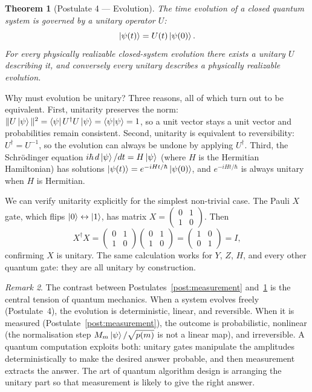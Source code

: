 \documentclass[12pt, a4paper, oneside]{report}
\theoremstyle{plain}
\newtheorem{theorem}{Theorem}[chapter]
\theoremstyle{definition}
\theoremstyle{remark}
\newtheorem{remark}[theorem]{Remark}
\begin{document}
\begin{theorem}[Postulate 4 --- Evolution]
	\label{post:evolution}
	The time evolution of a closed quantum system is governed by a unitary operator $U$:
	\[
		\ket{\psi(t)} = U(t)\ket{\psi(0)}.
	\]
	For every physically realizable closed-system evolution there exists a unitary $U$ describing
	it, and conversely every unitary describes a physically realizable evolution.
\end{theorem}

Why must evolution be unitary? Three reasons, all of which turn out to be equivalent.
First, unitarity preserves the norm: $\|U\ket{\psi}\|^2 = \bra{\psi}U^\dagger U\ket{\psi}
	= \braket{\psi|\psi} = 1$, so a unit vector stays a unit vector and probabilities remain
consistent. Second, unitarity is equivalent to reversibility: $U^\dagger = U^{-1}$, so the
evolution can always be undone by applying $U^\dagger$. Third, the Schrödinger equation
$i\hbar\,d\ket{\psi}/dt = H\ket{\psi}$ (where $H$ is the Hermitian Hamiltonian) has
solutions $\ket{\psi(t)} = e^{-iHt/\hbar}\ket{\psi(0)}$, and $e^{-iHt/\hbar}$ is always
unitary when $H$ is Hermitian.

We can verify unitarity explicitly for the simplest non-trivial case. The Pauli $X$ gate,
which flips $\ket{0} \leftrightarrow \ket{1}$, has matrix $X = \begin{pmatrix}0 & 1 \\1&0
	\end{pmatrix}$. Then
\[
	X^\dagger X
	= \begin{pmatrix}0&1\\1&0\end{pmatrix}\begin{pmatrix}0&1\\1&0\end{pmatrix}
	= \begin{pmatrix}1&0\\0&1\end{pmatrix} = I,
\]
confirming $X$ is unitary. The same calculation works for $Y$, $Z$, $H$, and every other
quantum gate: they are all unitary by construction.

\begin{remark}
	The contrast between Postulates~\ref{post:measurement} and~\ref{post:evolution} is the
	central tension of quantum mechanics. When a system evolves freely (Postulate~4), the
	evolution is deterministic, linear, and reversible. When it is measured
	(Postulate~\ref{post:measurement}), the outcome is probabilistic, nonlinear (the normalisation
	step $M_m\ket{\psi}/\sqrt{p(m)}$ is not a linear map), and irreversible. A quantum computation
	exploits both: unitary gates manipulate the amplitudes deterministically to make the desired
	answer probable, and then measurement extracts the answer. The art of quantum algorithm
	design is arranging the unitary part so that measurement is likely to give the right answer.
\end{remark}
\end{document}
